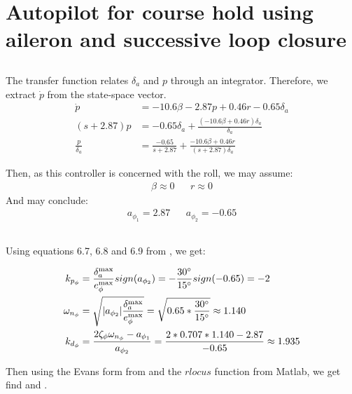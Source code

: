 \section{Autopilot for course hold using aileron and successive loop closure}
\subsection{}
The transfer function relates $\delta_a$ and $p$ through an integrator. Therefore, we extract $\dot{p}$ from the state-space vector. 
\begin{align*}
    \dot{p} &= -10.6 \beta - 2.87 p + 0.46 r - 0.65 \delta_a \\
    (s + 2.87) p &= - 0.65 \delta_a  + \frac{(-10.6 \beta + 0.46 r) \delta_a }{\delta_a} \\
    \frac{p}{\delta_a} &= \frac{-0.65}{s + 2.87} + \frac{-10.6 \beta + 0.46 r}{(s + 2.87)\delta_a}
\end{align*}

Then, as this controller is concerned with the roll, we may assume: %
\begin{align*}
    \beta \approx 0 && r \approx 0
\end{align*}
And may conclude: 
\begin{align*}
    a_{\phi_1} = 2.87 && a_{\phi_2} = -0.65
\end{align*}

\subsection{}
Using equations 6.7, 6.8 and 6.9 from \cite[page 100]{beard_mclain_2012}, we get: 

\begin{align*}
    k_{p_\phi} &= \frac{\delta_{a}^{\max}}{e_{\phi}^{\max}} sign(a_{\phi_2}) 
    = - \frac{30 \degree}{15 \degree} sign(-0.65)
    = -2 \\
    \omega_{n_{\phi}} &= \sqrt{|a_{\phi_2}| \frac{\delta_a^{\max}}{e_{\phi}^{\max}}} 
    = \sqrt{0.65 * \frac{30 \degree}{15 \degree}} 
    \approx 1.140 \\
    k_{d_\phi} &= \frac{2 \zeta_{\phi} \omega_{n_\phi} - a_{\phi_1}}{a_{\phi_2}} 
    = \frac{2 * 0.707 * 1.140 - 2.87}{-0.65}
    \approx 1.935
\end{align*}

Then using the Evans form from \cite[page 102]{beard_mclain_2012} and the $rlocus$ function from Matlab, we get find  and . 

